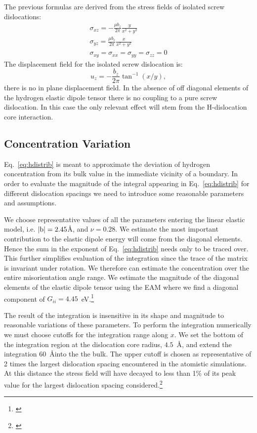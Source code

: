 \documentclass{article}
\begin{document}
The previous formulas are derived from the stress fields of isolated 
screw dislocations:
%
\begin{align*}
\sigma_{xz} = -\frac{\mu b_{z}}{2\pi}\frac{y}{x^{2} + y^{2}}\\
\sigma_{yz} =  \frac{\mu b_{z}}{2\pi}\frac{x}{x^{2} + y^{2}}\\
\sigma_{xy} =  \sigma_{xx}=\sigma_{yy}=\sigma_{zz}=0
\end{align*}
%
The displacement field for the isolated screw dislocation is:
%
\begin{equation}
u_{z} = -\frac{b_{z}}{2\pi} \tan^{-1}(x/y),
\end{equation}
%
there is no in plane displacement field. In the absence of off diagonal 
elements of the hydrogen elastic dipole tensor there is no coupling 
to a pure screw dislocation. In this case the only relevant effect 
will stem from the H-dislocation core interaction.

\subsection{Concentration Variation}
Eq.~\ref{eq:hdistrib} is meant to approximate the deviation of hydrogen concentration
from its bulk value in the immediate vicinity of a boundary.
In order to evaluate the magnitude of the integral appearing in Eq.~\ref{eq:hdistrib}
for different dislocation spacings we need to introduce some reasonable 
parameters and assumptions. 

We choose representative values of all the parameters entering the linear elastic model,
i.e. $|{\rm b}|=2.45$\AA, and $\nu=0.28$. We estimate the most important contribution
to the elastic dipole energy will come from the diagonal elements. Hence the sum in the
exponent of Eq.~\ref{eq:hdistrib} needs only to be traced over. 
This further simplifies evaluation of the integration since
the trace of the matrix is invariant under rotation. We therefore 
can estimate the concentration over the entire misorientation angle range. 
We estimate the magnitude of the diagonal elements of the elastic dipole tensor using the EAM
where we find a diagonal component of $G_{ii}=4.45$~eV.\footnote{\cite{ramasubramaniam09}}

The result of the integration is insensitive in its shape and magnitude to reasonable variations 
of these parameters. To perform the integration numerically we must choose cutoffs
for the integration range along $x$. We set the bottom of the integration region at 
the dislocation core radius, $4.5$~\AA, and extend the integration $60$~\AA into the the bulk. 
The upper cutoff is chosen as representative of 2 times the largest dislocation 
spacing encountered in the atomistic simulations.
At this distance the stress field will have decayed to less than 1\% 
of its peak value for the largest dislocation
spacing considered.\footnote{\cite{sutton95}}
\end{document}
